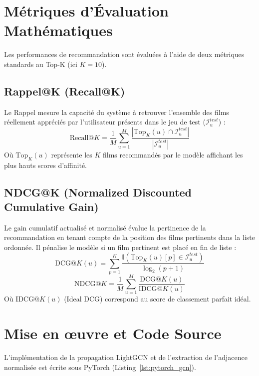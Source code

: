 \documentclass[12pt,a4paper]{article}
\begin{document}
\section{Métriques d'Évaluation Mathématiques}
Les performances de recommandation sont évaluées à l'aide de deux métriques standards au Top-K (ici $K=10$).

\subsection{Rappel@K (Recall@K)}
Le Rappel mesure la capacité du système à retrouver l'ensemble des films réellement appréciés par l'utilisateur présents dans le jeu de test ($\mathcal{I}_u^{test}$) :
\begin{equation}
    \text{Recall}@K = \frac{1}{M} \sum_{u=1}^{M} \frac{|\text{Top}_K(u) \cap \mathcal{I}_u^{test}|}{|\mathcal{I}_u^{test}|}
\end{equation}
Où $\text{Top}_K(u)$ représente les $K$ films recommandés par le modèle affichant les plus hauts scores d'affinité.

\subsection{NDCG@K (Normalized Discounted Cumulative Gain)}
Le gain cumulatif actualisé et normalisé évalue la pertinence de la recommandation en tenant compte de la position des films pertinents dans la liste ordonnée. Il pénalise le modèle si un film pertinent est placé en fin de liste :
\begin{equation}
    \text{DCG}@K(u) = \sum_{p=1}^{K} \frac{\mathbb{I}(\text{Top}_K(u)[p] \in \mathcal{I}_u^{test})}{\log_2(p + 1)}
\end{equation}
\begin{equation}
    \text{NDCG}@K = \frac{1}{M} \sum_{u=1}^{M} \frac{\text{DCG}@K(u)}{\text{IDCG}@K(u)}
\end{equation}
Où $\text{IDCG}@K(u)$ (Ideal DCG) correspond au score de classement parfait idéal.

\section{Mise en \oe{}uvre et Code Source}
L'implémentation de la propagation LightGCN et de l'extraction de l'adjacence normalisée est écrite sous PyTorch (Listing~\ref{lst:pytorch_gcn}).
\end{document}
